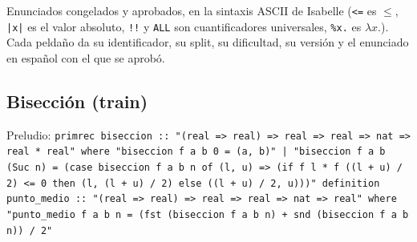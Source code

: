 \documentclass[11pt,a4paper]{article}
\begin{document}
\raggedright  %

Enunciados congelados y aprobados, en la sintaxis ASCII de Isabelle (\texttt{<=} es $\le$, \texttt{|x|} es el valor absoluto, \texttt{!!} y \texttt{ALL} son cuantificadores universales, \texttt{\%x.} es $\lambda x.$). Cada peldaño da su identificador, su split, su dificultad, su versión y el enunciado en español con el que se aprobó.

\subsection{Bisección (train)}

{\footnotesize Preludio: \texttt{primrec biseccion :\allowbreak{}:\allowbreak{} "(\allowbreak{}real =\allowbreak{}> real) =\allowbreak{}> real =\allowbreak{}> real =\allowbreak{}> nat =\allowbreak{}> real *\allowbreak{} real" where "biseccion f a b 0 =\allowbreak{} (\allowbreak{}a,\allowbreak{} b)" |\allowbreak{} "biseccion f a b (\allowbreak{}Suc n) =\allowbreak{} (\allowbreak{}case biseccion f a b n of (\allowbreak{}l,\allowbreak{} u) =\allowbreak{}> (\allowbreak{}if f l *\allowbreak{} f (\allowbreak{}(\allowbreak{}l +\allowbreak{} u) /\allowbreak{} 2) <=\allowbreak{} 0 then (\allowbreak{}l,\allowbreak{} (\allowbreak{}l +\allowbreak{} u) /\allowbreak{} 2) else (\allowbreak{}(\allowbreak{}l +\allowbreak{} u) /\allowbreak{} 2,\allowbreak{} u)))" definition punto\_\allowbreak{}medio :\allowbreak{}:\allowbreak{} "(\allowbreak{}real =\allowbreak{}> real) =\allowbreak{}> real =\allowbreak{}> real =\allowbreak{}> nat =\allowbreak{}> real" where "punto\_\allowbreak{}medio f a b n =\allowbreak{} (\allowbreak{}fst (\allowbreak{}biseccion f a b n) +\allowbreak{} snd (\allowbreak{}biseccion f a b n)) /\allowbreak{} 2"}\par}
\end{document}
